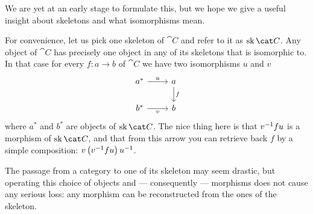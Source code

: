  We are yet at an early stage to formulate this,
but we hope we give a useful insight about skeletons and what
isomorphisms mean.

For convenience, let us pick one skeleton of \(\cat C\) and refer to
it as \(\sk{\cat C}\). Any object of \(\cat C\) has precisely one
object in any of its skeletons that is isomorphic to. In that case for
every \(f : a \to b\) of \(\cat C\) we have two isomorphisms \(u\) and
\(v\)
\[\begin{tikzcd}
    a^\ast \ar["u", r] & a \ar["f", d] \\
    b^\ast \ar["v", r, swap] & b
  \end{tikzcd}\] where \(a^\ast\) and \(b^\ast\) are objects of
\(\sk{\cat C}\). The nice thing here is that \(v^{-1} f u\) is a
morphism of \(\sk{\cat C}\), and that from this arrow you can retrieve
back \(f\) by a simple composition:
\(v \left(v^{-1} f u \right) u^{-1}\).

The passage from a category to one of its skeleton may seem drastic,
but operating this choice of objects and --- consequently --- morphisms
does not cause any serious loss: any morphism can be reconstructed
from the ones of the skeleton.

